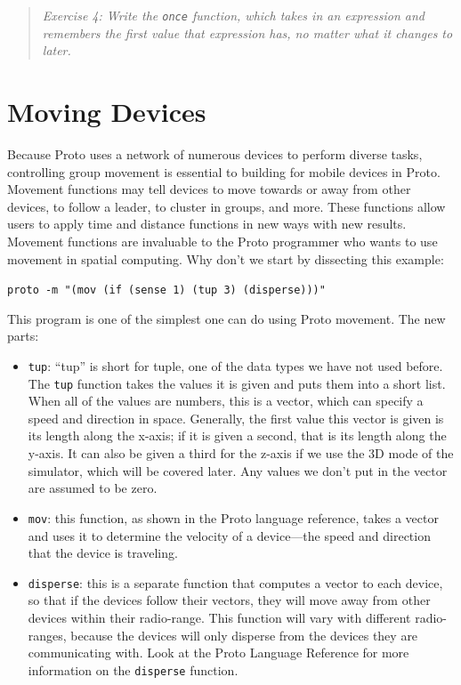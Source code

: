 \documentclass{article}
\newcommand\code[1]{\begin{center}\var{#1}\end{center}}
\newcommand\problem[1]{\begin{quote}{\em #1}\end{quote}}
\newcommand\var[1]{{\tt #1}}
\begin{document}
\problem{Exercise 4: Write the \var{once} function, which takes in
  an expression and remembers the first value that expression has,
  no matter what it changes to later.}


\section{Moving Devices}
\label{s:move}

Because Proto uses a network of numerous devices to perform diverse
tasks, controlling group movement is essential to building for mobile
devices in Proto.  Movement functions may tell devices to move
towards or away from other devices, to follow a leader, to cluster in
groups, and more.  These functions allow users to apply time and
distance functions in new ways with new results. Movement functions
are invaluable to the Proto programmer who wants to use movement in
spatial computing.  Why don't we start by dissecting this example:

\code{proto -m "(mov (if (sense 1) (tup 3) (disperse)))"}

This program is one of the simplest one can do using Proto
movement. The new parts:
\begin{itemize}
\item \var{tup}: ``tup'' is short for tuple, one of the data types we
  have not used before.  The \var{tup} function takes the values it is
  given and puts them into a short list.  When all of the values are
  numbers, this is a vector, which can specify a speed and
  direction in space.  Generally, the first value this vector is given
  is its length along the x-axis; if it is given a second, that is its
  length along the y-axis.  It can also be given a third for the
  z-axis if we use the 3D mode of the simulator, which will be covered
  later.  Any values we don't put in the vector are assumed to be
  zero.
\item \var{mov}: this function, as shown in the Proto language
  reference, takes a vector and uses it to determine the velocity of a
  device---the speed and direction that the device is traveling.
\item \var{disperse}: this is a separate function that computes a
  vector to each device, so that if the devices follow their vectors,
  they will move away from other devices within their radio-range.
  This function will vary with different radio-ranges, because the
  devices will only disperse from the devices they are communicating
  with.  Look at the Proto Language Reference for more
  information on the \var{disperse} function.
\end{itemize}
\end{document}
